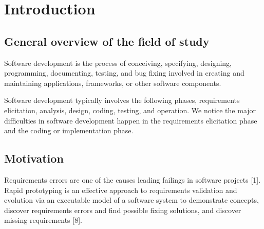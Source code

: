 \chapter{Introduction}



\section{General overview of the field of study}
Software development is the process of conceiving, specifying, designing, programming, documenting, testing, and bug fixing involved in creating and maintaining applications, frameworks, or other software components. 

Software development typically involves the following phases, requirements elicitation, analysis, design, coding, testing, and operation. We notice the major difficulties in software development happen in the requirements elicitation phase and the coding or implementation phase.

\section{Motivation}

Requirements errors are one of the causes leading failings in software projects [1]. 
Rapid prototyping is an effective approach to requirements validation and evolution via an executable model of a software system to demonstrate concepts, discover requirements errors and find possible fixing solutions, and discover missing requirements [8]. 

